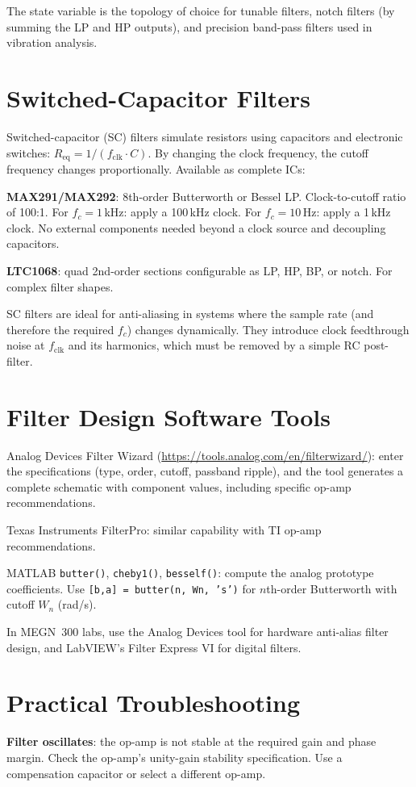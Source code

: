 \documentclass[11pt,letterpaper,twoside,openany]{book}
\begin{document}
The state variable is the topology of choice for tunable filters, notch filters (by summing the LP and HP outputs), and precision band-pass filters used in vibration analysis.

\section{Switched-Capacitor Filters}
Switched-capacitor (SC) filters simulate resistors using capacitors and electronic switches: $R_{\text{eq}} = 1/(f_{\text{clk}} \cdot C)$. By changing the clock frequency, the cutoff frequency changes proportionally. Available as complete ICs:

\textbf{MAX291/MAX292}: 8th-order Butterworth or Bessel LP. Clock-to-cutoff ratio of 100:1. For $f_c = 1$\,kHz: apply a 100\,kHz clock. For $f_c = 10$\,Hz: apply a 1\,kHz clock. No external components needed beyond a clock source and decoupling capacitors.

\textbf{LTC1068}: quad 2nd-order sections configurable as LP, HP, BP, or notch. For complex filter shapes.

SC filters are ideal for anti-aliasing in systems where the sample rate (and therefore the required $f_c$) changes dynamically. They introduce clock feedthrough noise at $f_{\text{clk}}$ and its harmonics, which must be removed by a simple RC post-filter.

\section{Filter Design Software Tools}
Analog Devices Filter Wizard (\url{https://tools.analog.com/en/filterwizard/}): enter the specifications (type, order, cutoff, passband ripple), and the tool generates a complete schematic with component values, including specific op-amp recommendations.

Texas Instruments FilterPro: similar capability with TI op-amp recommendations.

MATLAB \texttt{butter()}, \texttt{cheby1()}, \texttt{besself()}: compute the analog prototype coefficients. Use \texttt{[b,a] = butter(n, Wn, 's')} for $n$th-order Butterworth with cutoff $W_n$ (rad/s).

In MEGN~300 labs, use the Analog Devices tool for hardware anti-alias filter design, and LabVIEW's Filter Express VI for digital filters.

\section{Practical Troubleshooting}
\textbf{Filter oscillates}: the op-amp is not stable at the required gain and phase margin. Check the op-amp's unity-gain stability specification. Use a compensation capacitor or select a different op-amp.
\end{document}
